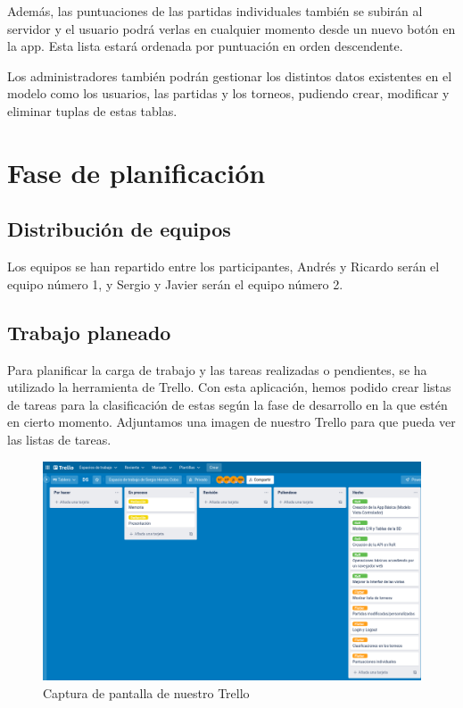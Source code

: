 \documentclass{article}
\begin{document}
 Además, las puntuaciones de las partidas individuales también se subirán al servidor y el usuario podrá verlas en cualquier momento desde un nuevo botón en la app. Esta 
 lista estará ordenada por puntuación en orden descendente.

Los administradores también podrán gestionar los distintos datos existentes en el modelo como los usuarios, las partidas y los torneos, pudiendo crear, modificar y eliminar tuplas
de estas tablas.

\section{Fase de planificación}
\subsection{Distribución de equipos}

Los equipos se han repartido entre los participantes, Andrés y Ricardo serán el equipo número 1, y Sergio y Javier serán el equipo número 2.

\subsection{Trabajo planeado}
Para planificar la carga de trabajo y las tareas realizadas o pendientes, se ha utilizado la herramienta de Trello. Con esta aplicación,
hemos podido crear listas de tareas para la clasificación de estas según la fase de desarrollo en la que estén en cierto momento. Adjuntamos una imagen
de nuestro Trello para que pueda ver las listas de tareas.
\begin{figure}[H]
  \includegraphics[width=\textwidth]{imagenes/trello.png}
  \caption{Captura de pantalla de nuestro Trello} 
\end{figure}
\end{document}
